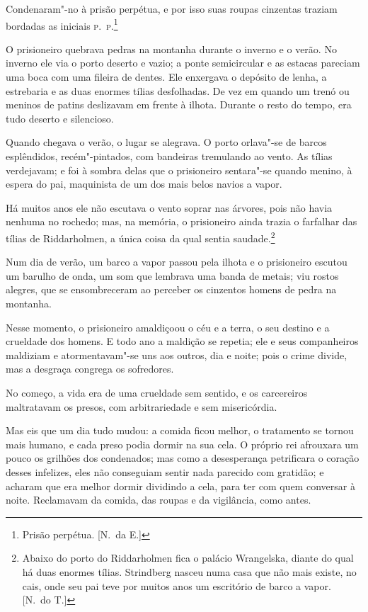 Condenaram"-no à prisão perpétua, e por isso suas roupas cinzentas
traziam bordadas as iniciais \textsc{p.~p.}\footnote{ Prisão perpétua. [N.~da E.]}

O prisioneiro quebrava pedras na montanha durante o inverno e o verão.
No inverno ele via o porto deserto e vazio; a ponte semicircular e as
estacas pareciam uma boca com uma fileira de dentes. Ele enxergava o
depósito de lenha, a estrebaria e as duas enormes tílias desfolhadas.
De vez em quando um trenó ou meninos de patins deslizavam em frente à
ilhota. Durante o resto do tempo, era tudo deserto e silencioso.

Quando chegava o verão, o lugar se alegrava. O porto orlava"-se de
barcos esplêndidos, recém"-pintados, com bandeiras tremulando ao
vento. As tílias verdejavam; e foi à sombra delas que o prisioneiro
sentara"-se quando menino, à espera do pai, maquinista de um dos mais
belos navios a vapor.

Há muitos anos ele não escutava o vento soprar nas árvores, pois não
havia nenhuma no rochedo; mas, na memória, o prisioneiro ainda trazia o
farfalhar das tílias de Riddarholmen, a única coisa da qual sentia
saudade.\footnote{ Abaixo do porto do Riddarholmen fica o palácio 
Wrangelska, diante do qual há duas enormes tílias. Strindberg nasceu
numa casa que não mais existe, no cais, onde seu pai teve por muitos
anos um escritório de barco a vapor. [N.~do T.]}

Num dia de verão, um barco a vapor passou pela ilhota e o prisioneiro
escutou um barulho de onda, um som que lembrava uma banda de metais;
viu rostos alegres, que se ensombreceram ao perceber os cinzentos
homens de pedra na montanha.

Nesse momento, o prisioneiro amaldiçoou o céu e a terra, o seu destino e
a crueldade dos homens. E todo ano a maldição se repetia; ele e seus
companheiros maldiziam e atormentavam"-se uns aos outros, dia e noite;
pois o crime divide, mas a desgraça congrega os sofredores.

No começo, a vida era de uma crueldade sem sentido, e os carcereiros
maltratavam os presos, com arbitrariedade e sem misericórdia.

Mas eis que um dia tudo mudou: a comida ficou melhor, o tratamento
se tornou mais humano, e cada preso podia dormir na sua cela. O próprio
rei afrouxara um pouco os grilhões dos condenados; mas como a
desesperança petrificara o coração desses infelizes, eles não
conseguiam sentir nada parecido com gratidão; e acharam que era
melhor dormir dividindo a cela, para ter com quem conversar à noite. 
Reclamavam da comida, das roupas e da vigilância, como antes.

